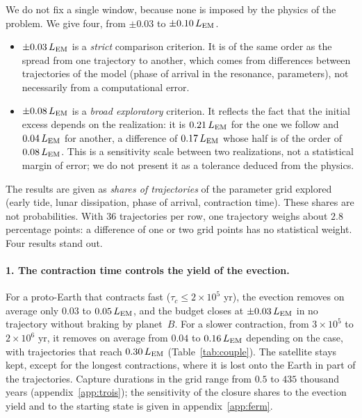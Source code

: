 \documentclass[11pt,a4paper]{article}
\newcommand{\LEM}{\ensuremath{L_{\rm EM}}}
\begin{document}
We do not fix a single window, because none is imposed by the physics of the problem. We give four, from $\pm0.03$ to $\pm0.10\,\LEM$.
\begin{itemize}[leftmargin=1.6em,itemsep=2pt]
\item $\pm0.03\,\LEM$ is a \emph{strict} comparison criterion. It is of the same order as the spread from one trajectory to another, which comes from differences between trajectories of the model (phase of arrival in the resonance, parameters), not necessarily from a computational error.
\item $\pm0.08\,\LEM$ is a \emph{broad exploratory} criterion. It reflects the fact that the initial excess depends on the realization: it is $0.21\,\LEM$ for the one we follow and $0.04\,\LEM$ for another, a difference of $0.17\,\LEM$ whose half is of the order of $0.08\,\LEM$. This is a sensitivity scale between two realizations, not a statistical margin of error; we do not present it as a tolerance deduced from the physics.
\end{itemize}
The results are given as \emph{shares of trajectories} of the parameter grid explored (early tide, lunar dissipation, phase of arrival, contraction time). These shares are not probabilities. With $36$ trajectories per row, one trajectory weighs about $2.8$ percentage points: a difference of one or two grid points has no statistical weight. Four results stand out.

\paragraph{1. The contraction time controls the yield of the evection.} For a proto-Earth that contracts fast ($\tau_c\le2\times10^5$ yr), the evection removes on average only $0.03$ to $0.05\,\LEM$, and the budget closes at $\pm0.03\,\LEM$ in no trajectory without braking by planet~$B$. For a slower contraction, from $3\times10^5$ to $2\times10^6$ yr, it removes on average from $0.04$ to $0.16\,\LEM$ depending on the case, with trajectories that reach $0.30\,\LEM$ (Table~\ref{tab:couple}). The satellite stays kept, except for the longest contractions, where it is lost onto the Earth in part of the trajectories. Capture durations in the grid range from $0.5$ to $435$ thousand years (appendix~\ref{app:trois}); the sensitivity of the closure shares to the evection yield and to the starting state is given in appendix~\ref{app:ferm}.
\end{document}

